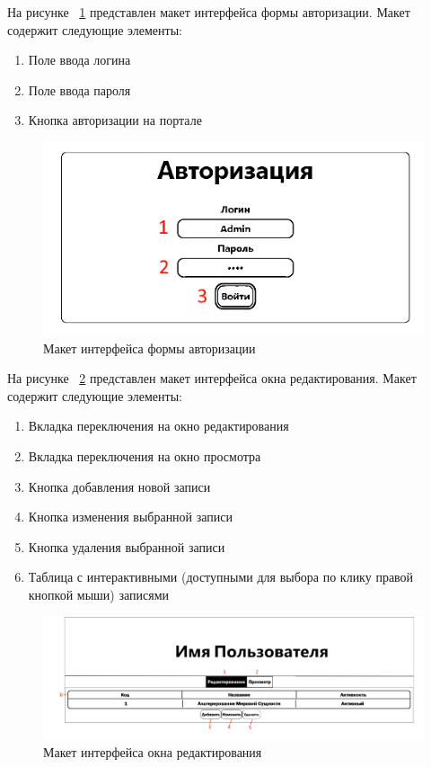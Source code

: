 На рисунке ~\ref{fig:inter3} представлен макет интерфейса формы авторизации. Макет содержит следующие элементы:
\begin{enumerate}
\item Поле ввода логина
\item Поле ввода пароля
\item Кнопка авторизации на портале
\end{enumerate}

\begin{figure}[H]
	\centering
	\includegraphics[width=0.5\linewidth]{images/inter3}
	\caption{Макет интерфейса формы авторизации}
	\label{fig:inter3}
\end{figure}

На рисунке ~\ref{fig:inter1} представлен макет интерфейса окна редактирования. Макет содержит следующие элементы:
\begin{enumerate}
	\item Вкладка переключения на окно редактирования
	\item Вкладка переключения на окно просмотра
	\item Кнопка добавления новой записи
	\item Кнопка изменения выбранной записи
	\item Кнопка удаления выбранной записи
	\item Таблица с интерактивными (доступными для выбора по клику правой кнопкой мыши) записями
\end{enumerate}

\begin{figure}[H]
	\centering
	\includegraphics[width=1\linewidth]{images/inter1}
	\caption{Макет интерфейса окна редактирования}
	\label{fig:inter1}
\end{figure}


